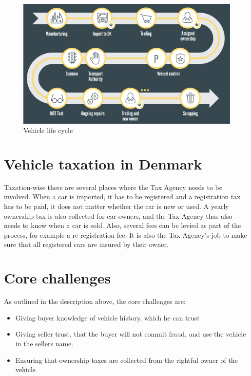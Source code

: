 \documentclass[oneside,a4paper,10pts,article]{memoir}
\begin{document}
\begin{figure} %
  \centering
  \includegraphics[width=\textwidth]{lifecycle.png}
  \caption{Vehicle life cycle}
  \label{fig:lifecycle}
\end{figure}

\section{Vehicle taxation in Denmark}
Taxation-wise there are several places where the Tax Agency needs to
be involved. When a car is imported, it has to be registered and a
registration tax has to be paid, it does not matter whether the car is
new or used. A yearly ownership tax is also collected for car owners,
and the Tax Agency thus also needs to know when a car is sold. Also,
several fees can be levied as part of the process, for example a
re-registration fee. It is also the Tax Agency's job to make sure that
all registered cars are insured by their owner.

\section{Core challenges}
As outlined in the description above, the core challenges are:

\begin{itemize}
\item Giving buyer knowledge of vehicle history, which he can trust
\item Giving seller trust, that the buyer will not commit fraud, and
  use the vehicle in the sellers name.
\item Ensuring that ownership taxes are collected from the rightful
  owner of the vehicle
\end{itemize}
\end{document}
